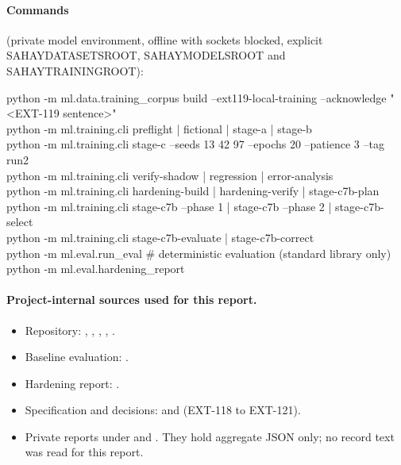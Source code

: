 \documentclass[11pt,a4paper]{article}
\newcommand{\codeus}{\textunderscore\allowbreak}
\DeclareRobustCommand{\code}[1]{{\ttfamily\let\_\codeus #1}}
\begin{document}
\paragraph{Commands} (private model environment, offline with sockets blocked, explicit
\code{SAHAY\_DATASETS\_ROOT}, \code{SAHAY\_MODELS\_ROOT} and \code{SAHAY\_TRAINING\_ROOT}):

\begin{tcolorbox}[enhanced,colback=sahaygray!5,colframe=sahaygray!40,boxrule=0.4pt,arc=1pt,left=4pt,right=4pt,top=2pt,bottom=2pt]
\footnotesize\ttfamily
python -m ml.data.training\_corpus build --ext119-local-training --acknowledge "<EXT-119 sentence>"\\
python -m ml.training.cli preflight | fictional | stage-a | stage-b\\
python -m ml.training.cli stage-c --seeds 13 42 97 --epochs 20 --patience 3 --tag run2\\
python -m ml.training.cli verify-shadow | regression | error-analysis\\
python -m ml.training.cli hardening-build | hardening-verify | stage-c7b-plan\\
python -m ml.training.cli stage-c7b --phase 1 | stage-c7b --phase 2 | stage-c7b-select\\
python -m ml.training.cli stage-c7b-evaluate | stage-c7b-correct\\
python -m ml.eval.run\_eval \quad\# deterministic evaluation (standard library only)\\
python -m ml.eval.hardening\_report
\end{tcolorbox}

\paragraph{Project-internal sources used for this report.}
\begin{itemize}[itemsep=0pt]
  \item Repository: , ,
        , ,
        .
  \item Baseline evaluation: .
  \item Hardening report: .
  \item Specification and decisions:  and
         (EXT-118 to EXT-121).
  \item Private reports under  and .
        They hold aggregate JSON only; no record text was read for this report.
\end{itemize}
\end{document}
